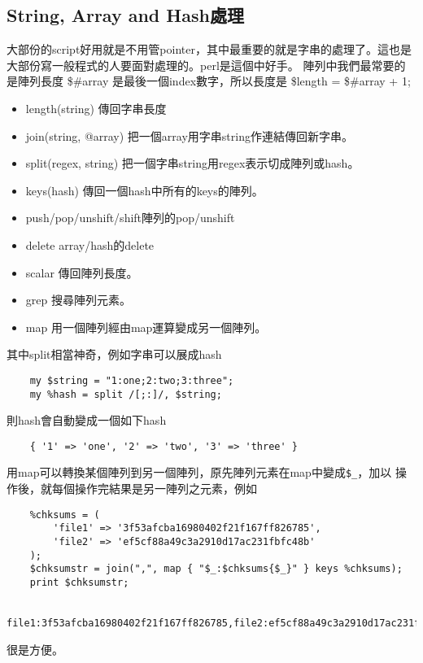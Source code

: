     \subsection{String, Array and Hash處理}
    大部份的script好用就是不用管pointer，其中最重要的就是字串的處理了。這也是
    大部份寫一般程式的人要面對處理的。perl是這個中好手。
    陣列中我們最常要的是陣列長度 \$\#array 是最後一個index數字，所以長度是
    \$length = \$\#array + 1;
    \begin{itemize}
      \item length(string)	傳回字串長度
      \item join(string, @array)  把一個array用字串string作連結傳回新字串。
      \item split(regex, string)  把一個字串string用regex表示切成陣列或hash。
      \item keys(hash)		傳回一個hash中所有的keys的陣列。
      \item push/pop/unshift/shift陣列的pop/unshift
      \item delete		array/hash的delete
      \item scalar		傳回陣列長度。
      \item grep                搜尋陣列元素。
      \item map                 用一個陣列經由map運算變成另一個陣列。
    \end{itemize}
    其中split相當神奇，例如字串可以展成hash
    \begin{verbatim}
    my $string = "1:one;2:two;3:three";
    my %hash = split /[;:]/, $string;
    \end{verbatim}
    則hash會自動變成一個如下hash
    \begin{verbatim}
    { '1' => 'one', '2' => 'two', '3' => 'three' }
    \end{verbatim}
    用map可以轉換某個陣列到另一個陣列，原先陣列元素在map中變成\verb=$_=，加以
    操作後，就每個操作完結果是另一陣列之元素，例如
    \begin{verbatim}
    %chksums = (
        'file1' => '3f53afcba16980402f21f167ff826785',
        'file2' => 'ef5cf88a49c3a2910d17ac231fbfc48b'
    );
    $chksumstr = join(",", map { "$_:$chksums{$_}" } keys %chksums);
    print $chksumstr;

    file1:3f53afcba16980402f21f167ff826785,file2:ef5cf88a49c3a2910d17ac231fbfc48b,
    \end{verbatim}
    很是方便。

